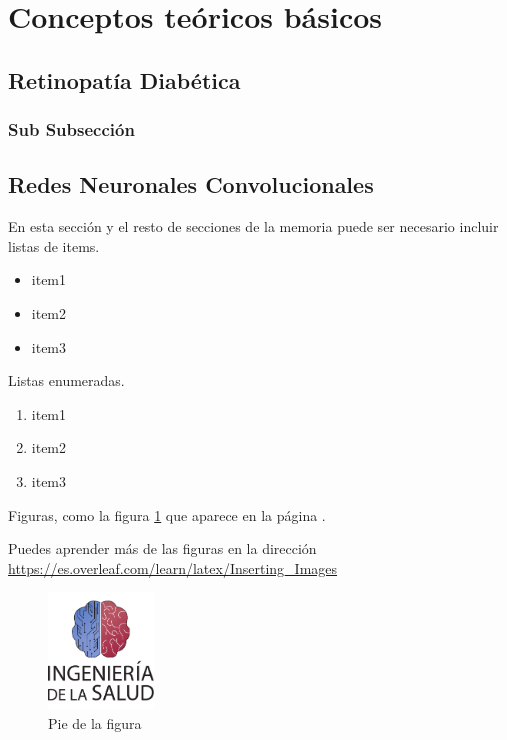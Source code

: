 \section{Conceptos teóricos básicos}

\subsection{Retinopatía Diabética}

\subsubsection{Sub Subsección}

\subsection{Redes Neuronales Convolucionales}

En esta sección y el resto de secciones de la memoria puede ser necesario incluir listas de items.

\begin{itemize}
    \item item1
    \item item2
    \item item3
\end{itemize}

Listas enumeradas.

\begin{enumerate}
    \item item1
    \item item2
    \item item3
\end{enumerate}

Figuras, como la figura \ref{fig:escudo} que aparece en la página \pageref{fig:escudo}. 

Puedes aprender más de las figuras en la dirección \url{https://es.overleaf.com/learn/latex/Inserting_Images}

\begin{figure}[h]
    \centering
    \includegraphics[width=0.25\textwidth]{img/escudoSalud.pdf}
    \caption{Pie de la figura}
    \label{fig:escudo}
\end{figure}


